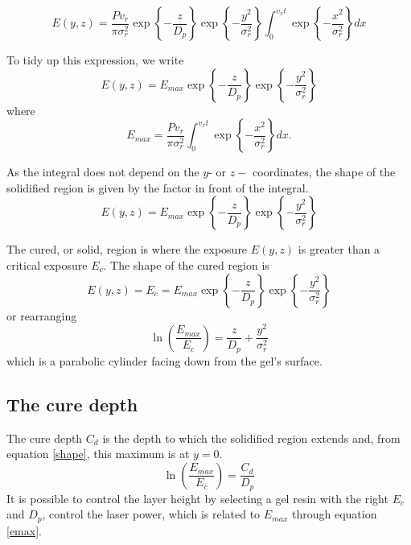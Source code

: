 \begin{equation}
 E\left(y,z\right) = \frac{P v_{r}}{\pi \sigma_{r}^{2}}  \exp \left\{ - \frac{z}{D_{p}}\right\} \exp \left\{ - \frac{y^{2}}{\sigma_{r}^{2}}  \right\} \int_{0}^{v_{x} t}  \exp \left\{ - \frac{x^{2}}{\sigma_{r}^{2}}  \right\} dx
\end{equation}

To tidy up this expression, we write 
\begin{equation}
 E\left(y,z\right) = E_{max}  \exp \left\{ - \frac{z}{D_{p}}\right\} \exp \left\{ - \frac{y^{2}}{\sigma_{r}^{2}}  \right\} 
\end{equation}
where 
\begin{equation}
 E_{max} = \frac{P v_{r}}{\pi \sigma_{r}^{2}} \int_{0}^{v_{x} t}  \exp \left\{ - \frac{x^{2}}{\sigma_{r}^{2}}  \right\} dx. 
 \label{emax}
\end{equation}

As the integral does not depend on the $y$- or $z-$ coordinates, the shape of the solidified region is given by the factor in front of the integral. 
\begin{equation}
 E\left(y,z\right)  = E_{max} \exp \left\{ - \frac{z}{D_{p}}\right\} \exp \left\{ - \frac{y^{2}}{\sigma_{r}^{2}}  \right\} 
\end{equation}

The cured, or solid, region is where the exposure $E\left(y,z\right)$ is greater than a critical exposure $E_{c}$. The shape of the cured region is 
\begin{equation}
 E\left(y,z\right)  = E_{c} = E_{max} \exp \left\{ - \frac{z}{D_{p}}\right\} \exp \left\{ - \frac{y^{2}}{\sigma_{r}^{2}}  \right\} 
\end{equation}
or rearranging 
\begin{equation}
\ln \left( \frac{ E_{max}}{E_{c} } \right) =  \frac{z}{D_{p}} + \frac{y^{2}}{\sigma_{r}^{2}} 
\label{shape}
\end{equation}
which is a parabolic cylinder facing down from the gel's surface. 

\subsection{The cure depth}

The cure depth $C_{d}$ is the depth to which the solidified region extends and, from equation \ref{shape}, this maximum is at $y=0$. 
\begin{equation}
\ln \left( \frac{ E_{max}}{E_{c} } \right) =  \frac{C_{d}}{D_{p}} 
\label{cd}
\end{equation}
It is possible to control the layer height by selecting a gel resin with the right $E_{c}$ and $D_{p}$, control the laser power, which is related to $E_{max}$ through equation \ref{emax}. 

